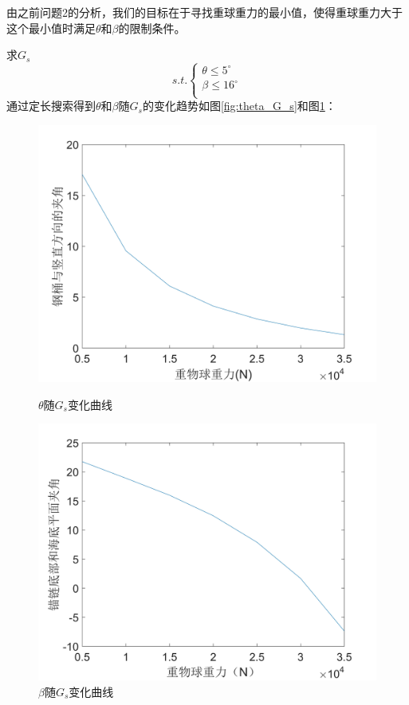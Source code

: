 \documentclass{cumcm}
\begin{document}
由之前问题2的分析，我们的目标在于寻找重球重力的最小值，使得重球重力大于这个最小值时满足$\theta$和$\beta$的限制条件。\par
求$G_s$
\begin{displaymath}
	s.t.\left\{
	\begin{aligned}
	\theta\le 5^\circ\\
	\beta \le 16^\circ\\
	\end{aligned}
	\right.
\end{displaymath}
通过定长搜索得到$\theta$和$\beta$随$G_s$的变化趋势如图\ref{fig:theta_G_s}和图\ref{fig:beta_G_s}：
\begin{figure}[H]
  \begin{minipage}[t]{0.5\linewidth}   
    \centering   
    \includegraphics[width=\textwidth]{img/theta_G_s.jpg}   
    \caption{$\theta$随$G_s$变化曲线}   
    \label{fig:theta_G_s}   
  \end{minipage}
   \begin{minipage}[t]{0.5\linewidth} %
      \centering   
      \includegraphics[width=\textwidth]{img/beta_G_s.jpg}   
      \caption{$\beta$随$G_s$变化曲线}   
      \label{fig:beta_G_s}   
    \end{minipage} 
\end{figure}
\end{document}
